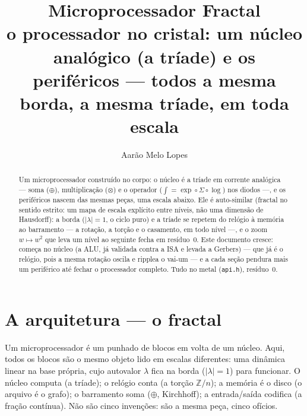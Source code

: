 \documentclass[11pt,a4paper]{article}
\title{\textbf{Microprocessador Fractal}\\[0.4em]
\large o processador no cristal: um núcleo analógico (a tríade) e os\\
periféricos --- todos a mesma borda, a mesma tríade, em toda escala}
\author{Aarão Melo Lopes}
\date{}
\begin{document}
\maketitle

\begin{abstract}
Um microprocessador construído no corpo: o núcleo é a tríade em corrente analógica ---
soma ($\oplus$), multiplicação ($\otimes$) e o operador
($\int = \exp \circ \Sigma \circ \log$) nos diodos ---, e os periféricos
nascem das mesmas peças, uma escala abaixo. Ele é auto-similar (fractal no sentido estrito:
um mapa de escala explícito entre níveis, não uma dimensão de Hausdorff): a borda ($|\lambda| = 1$,
o ciclo puro) e a tríade se repetem do relógio à memória ao barramento --- a rotação, a torção
e o casamento, em todo nível ---, e o zoom $w \mapsto w^{2}$ que leva um nível ao seguinte fecha em
resíduo~$0$. Este documento cresce: começa no núcleo (a ALU, já validada contra a ISA e
levada a Gerbers) --- que já é o relógio, pois a mesma rotação oscila e ripplea o vai-um --- e
a cada seção pendura mais um periférico até fechar o processador completo. Tudo no metal
(\texttt{api.h}), resíduo~$0$.
\end{abstract}

\section{A arquitetura --- o fractal}

Um microprocessador é um punhado de blocos em volta de um núcleo. Aqui, todos os blocos são
o mesmo objeto lido em escalas diferentes: uma dinâmica linear na base própria, cujo autovalor
$\lambda$ fica na borda ($|\lambda| = 1$) para funcionar. O núcleo computa (a tríade); o relógio conta (a
torção $\mathbb{Z}/n$); a memória é o disco (o arquivo é o grafo); o barramento soma ($\oplus$, Kirchhoff); a
entrada/saída codifica (a fração contínua). Não são cinco invenções: são a mesma peça,
cinco ofícios.
\end{document}
